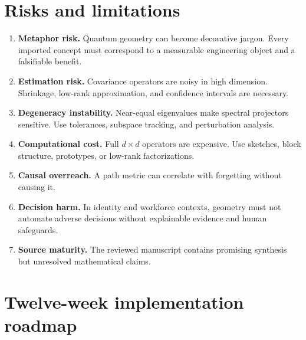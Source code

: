 \section{Risks and limitations}

\begin{enumerate}
  \item \textbf{Metaphor risk.} Quantum geometry can become decorative jargon. Every imported concept must correspond to a measurable engineering object and a falsifiable benefit.
  \item \textbf{Estimation risk.} Covariance operators are noisy in high dimension. Shrinkage, low-rank approximation, and confidence intervals are necessary.
  \item \textbf{Degeneracy instability.} Near-equal eigenvalues make spectral projectors sensitive. Use tolerances, subspace tracking, and perturbation analysis.
  \item \textbf{Computational cost.} Full $d\times d$ operators are expensive. Use sketches, block structure, prototypes, or low-rank factorizations.
  \item \textbf{Causal overreach.} A path metric can correlate with forgetting without causing it.
  \item \textbf{Decision harm.} In identity and workforce contexts, geometry must not automate adverse decisions without explainable evidence and human safeguards.
  \item \textbf{Source maturity.} The reviewed manuscript contains promising synthesis but unresolved mathematical claims.
\end{enumerate}

\section{Twelve-week implementation roadmap}

